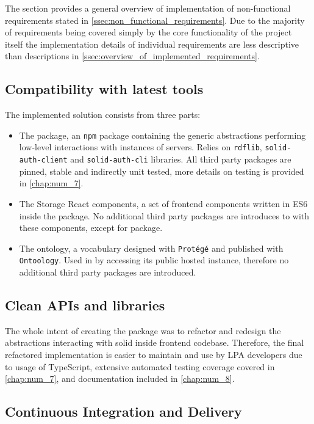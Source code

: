 The section provides a general overview of implementation of non-functional requirements stated in \autoref{ssec:non_functional_requirements}. Due to the majority of requirements being covered simply by the core functionality of the \solid{} project itself the implementation details of individual requirements are less descriptive than descriptions in \autoref{ssec:overview_of_implemented_requirements}.

\subsection{Compatibility with latest tools}

The implemented solution consists from three parts:
\begin{itemize}
    \item The \lpas{} package, an \texttt{npm} package containing the generic abstractions performing low-level interactions with instances of \solid{} servers. Relies on \texttt{rdflib}, \texttt{solid-auth-client} and \texttt{solid-auth-cli} libraries. All third party packages are pinned, stable and indirectly unit tested, more details on testing is provided in \autoref{chap:num_7}. 
    \item The Storage React components, a set of frontend components written in ES6 inside the \lpa{} package. No additional third party packages are introduces to \lpa{} with these components, except for \lpas{} package. 
    \item The \lpas{} ontology, a vocabulary designed with \texttt{Protégé} and published with \texttt{Ontoology}. Used in \lpa{} by accessing its public hosted instance, therefore no additional third party packages are introduced.
\end{itemize}

\subsection{Clean APIs and libraries}

The whole intent of creating the \lpas{} package was to refactor and redesign the abstractions interacting with solid inside \lpa{} frontend codebase. Therefore, the final refactored implementation is easier to maintain and use by LPA developers due to usage of TypeScript, extensive automated testing coverage covered in \autoref{chap:num_7}, and documentation included in \autoref{chap:num_8}.

\subsection{Continuous Integration and Delivery}

